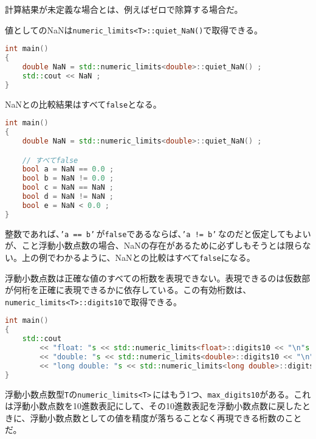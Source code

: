 計算結果が未定義な場合とは、例えばゼロで除算する場合だ。

値としてのNaNは\texttt{numeric\_limits<T>::quiet\_NaN()}で取得できる。

\begin{lstlisting}[language={C++}]
int main()
{
    double NaN = std::numeric_limits<double>::quiet_NaN() ;
    std::cout << NaN ;
}
\end{lstlisting}

NaNとの比較結果はすべて\texttt{false}となる。

\begin{lstlisting}[language={C++}]
int main()
{
    double NaN = std::numeric_limits<double>::quiet_NaN() ;

    // すべてfalse
    bool a = NaN == 0.0 ;
    bool b = NaN != 0.0 ;
    bool c = NaN == NaN ;
    bool d = NaN != NaN ;
    bool e = NaN < 0.0 ;
}
\end{lstlisting}

整数であれば、\texttt{'a == b'}\,が\texttt{false}であるならば、\texttt{'a != b'}\,なのだと仮定してもよいが、こと浮動小数点数の場合、NaNの存在があるために必ずしもそうとは限らない。上の例でわかるように、NaNとの比較はすべて\texttt{false}になる。


浮動小数点数は正確な値のすべての桁数を表現できない。表現できるのは仮数部が何桁を正確に表現できるかに依存している。この有効桁数は、\texttt{numeric\_limits<T>::digits10}で取得できる。

\ifTombow\pagebreak\fi
\begin{lstlisting}[language={C++}]
int main()
{
    std::cout
        << "float: "s << std::numeric_limits<float>::digits10 << "\n"s
        << "double: "s << std::numeric_limits<double>::digits10 << "\n"s
        << "long double: "s << std::numeric_limits<long double>::digits10 << "\n"s ;
}
\end{lstlisting}

浮動小数点数型\texttt{T}の\texttt{numeric\_limits<T>}\,にはもう1つ、\texttt{max\_digits10}がある。これは浮動小数点数を10進数表記にして、その10進数表記を浮動小数点数に戻したときに、浮動小数点数としての値を精度が落ちることなく再現できる桁数のことだ。

